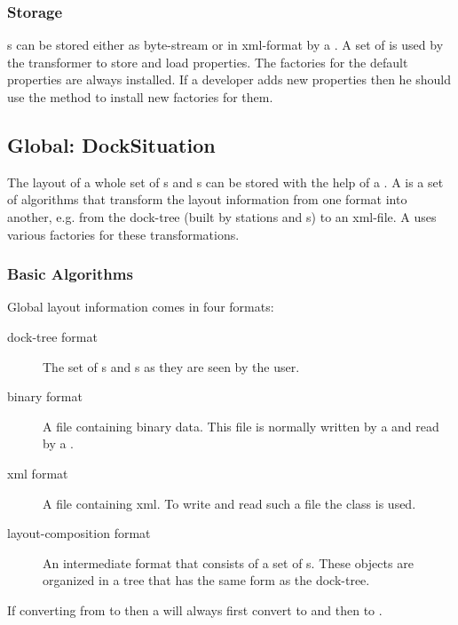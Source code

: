 
\subsubsection{Storage}
s can be stored either as byte-stream or in xml-format by a . A set of  is used by the transformer to store and load properties. The factories for the default properties are always installed. If a developer adds new properties then he should use the method  to install new factories for them.


\subsection{Global: DockSituation}
The layout of a whole set of s and s can be stored with the help of a . A  is a set of algorithms that transform the layout information from one format into another, e.g. from the dock-tree (built by stations and s) to an xml-file. A  uses various factories for these transformations.

\subsubsection{Basic Algorithms}
Global layout information comes in four formats:
\begin{description}
 \item[dock-tree format] The set of s and s as they are seen by the user.
 \item[binary format] A file containing binary data. This file is normally written by a  and read by a .
 \item[xml format] A file containing xml. To write and read such a file the class  is used.
 \item[layout-composition format] An intermediate format that consists of a set of s. These objects are organized in a tree that has the same form as the dock-tree.
\end{description}
If converting from  to  then a  will always first convert  to  and then  to .

